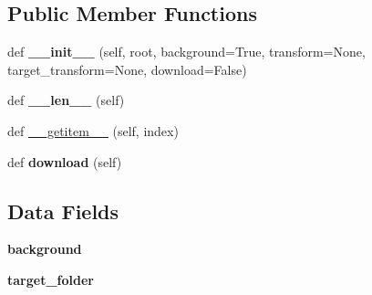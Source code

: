 \subsection*{Public Member Functions}
\begin{DoxyCompactItemize}
\item 
\mbox{\label{classtorchvision_1_1datasets_1_1omniglot_1_1Omniglot_aea0fd792b337813f8f5dc978644c1241}} 
def {\bfseries \+\_\+\+\_\+init\+\_\+\+\_\+} (self, root, background=True, transform=None, target\+\_\+transform=None, download=False)
\item 
\mbox{\label{classtorchvision_1_1datasets_1_1omniglot_1_1Omniglot_a444ae6111cb76cb3a163b9537d086cd3}} 
def {\bfseries \+\_\+\+\_\+len\+\_\+\+\_\+} (self)
\item 
def \hyperlink{classtorchvision_1_1datasets_1_1omniglot_1_1Omniglot_a43c310d2f8c2ca1f31615da228b2ec24}{\+\_\+\+\_\+getitem\+\_\+\+\_\+} (self, index)
\item 
\mbox{\label{classtorchvision_1_1datasets_1_1omniglot_1_1Omniglot_a898a01b580e231e923d42cecdbc160bd}} 
def {\bfseries download} (self)
\end{DoxyCompactItemize}
\subsection*{Data Fields}
\begin{DoxyCompactItemize}
\item 
\mbox{\label{classtorchvision_1_1datasets_1_1omniglot_1_1Omniglot_a258f30de4f53668fc9e157629221186c}} 
{\bfseries background}
\item 
\mbox{\label{classtorchvision_1_1datasets_1_1omniglot_1_1Omniglot_af49deda848d279a3429f671fb1b5471d}} 
{\bfseries target\+\_\+folder}
\end{DoxyCompactItemize}
